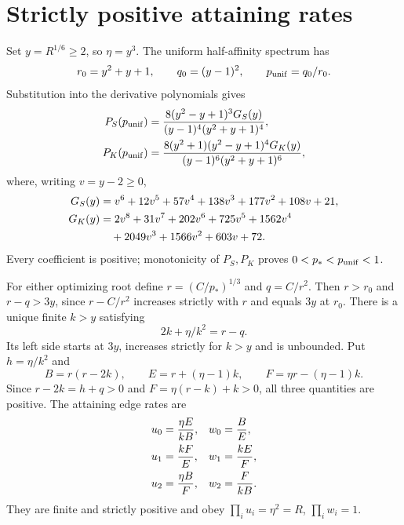 \documentclass[11pt,a4paper]{article}
\begin{document}
\section{Strictly positive attaining rates}
Set $y=R^{1/6}\geq2$, so $\eta=y^3$. The uniform half-affinity spectrum has
\begin{equation}
 r_0=y^2+y+1,\qquad q_0=(y-1)^2,\qquad p_{\rm unif}=q_0/r_0.
\end{equation}
Substitution into the derivative polynomials gives
\begin{align}
 P_S(p_{\rm unif})&=\frac{8(y^2-y+1)^3G_S(y)}{(y-1)^4(y^2+y+1)^4},\\
 P_K(p_{\rm unif})&=\frac{8(y^2+1)(y^2-y+1)^4G_K(y)}{(y-1)^6(y^2+y+1)^6},
\end{align}
where, writing $v=y-2\geq0$,
\begin{align}
 G_S(y)&=v^6+12v^5+57v^4+138v^3+177v^2+108v+21,\\
 G_K(y)&=2v^8+31v^7+202v^6+725v^5+1562v^4\notag\\
 &\quad+2049v^3+1566v^2+603v+72.
\end{align}
Every coefficient is positive; monotonicity of $P_S,P_K$ proves $0<p_*<p_{\rm unif}<1$.

For either optimizing root define $r=(C/p_*)^{1/3}$ and $q=C/r^2$. Then $r>r_0$ and $r-q>3y$, since $r-C/r^2$ increases strictly with $r$ and equals $3y$ at $r_0$. There is a unique finite $k>y$ satisfying
\begin{equation}\label{eq:k}
 2k+\eta/k^2=r-q.
\end{equation}
Its left side starts at $3y$, increases strictly for $k>y$ and is unbounded. Put $h=\eta/k^2$ and
\begin{equation}
 B=r(r-2k),\qquad E=r+(\eta-1)k,\qquad F=\eta r-(\eta-1)k.
\end{equation}
Since $r-2k=h+q>0$ and $F=\eta(r-k)+k>0$, all three quantities are positive. The attaining edge rates are
\begin{align}\label{eq:rates}
 u_0&=\frac{\eta E}{kB},& w_0&=\frac{B}{E},\notag\\
 u_1&=\frac{kF}{E},&w_1&=\frac{kE}{F},\\
 u_2&=\frac{\eta B}{F},&w_2&=\frac{F}{kB}.\notag
\end{align}
They are finite and strictly positive and obey $\prod_i u_i=\eta^2=R$, $\prod_i w_i=1$.
\end{document}
